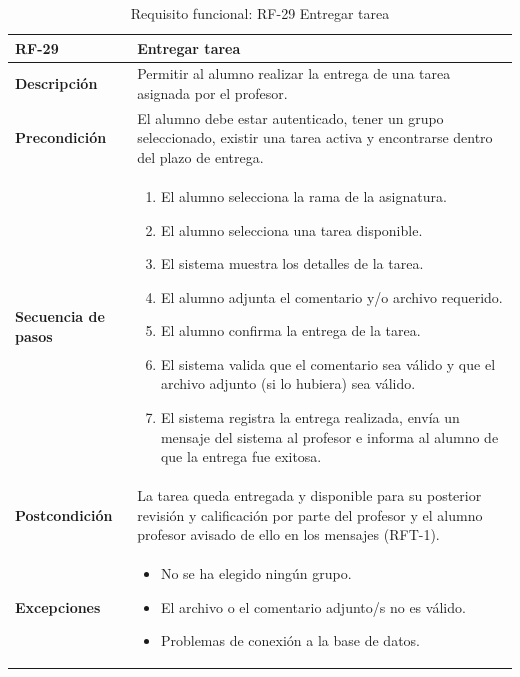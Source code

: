 \begin{table}[H]
\centering
\begin{tabularx}{\textwidth}{
  |>{\centering\arraybackslash}l
  |>{\centering\arraybackslash}X|}
\hline
\textbf{RF-29} & \textbf{Entregar tarea} \\ \hline

\textbf{Descripción} & Permitir al alumno realizar la entrega de una tarea asignada por el profesor. \\ \hline

\textbf{Precondición} & El alumno debe estar autenticado, tener un grupo seleccionado, existir una tarea activa y encontrarse dentro del plazo de entrega. \\ \hline

\textbf{Secuencia de pasos} &
\begin{enumerate}
  \item El alumno selecciona la rama de la asignatura.
  \item El alumno selecciona una tarea disponible.
  \item El sistema muestra los detalles de la tarea.
  \item El alumno adjunta el comentario y/o archivo requerido.
  \item El alumno confirma la entrega de la tarea.
  \item El sistema valida que el comentario sea válido y que el archivo adjunto (si lo hubiera) sea válido.
  \item El sistema registra la entrega realizada, envía un mensaje del sistema al profesor e informa al alumno de que la entrega fue exitosa.
\end{enumerate} \\ \hline

\textbf{Postcondición} & La tarea queda entregada y disponible para su posterior revisión y calificación por parte del profesor y el alumno profesor avisado de ello en los mensajes (RFT-1). \\ \hline

\textbf{Excepciones} &
\begin{itemize}
  \item No se ha elegido ningún grupo.
  \item El archivo o el comentario adjunto/s no es válido.
  \item Problemas de conexión a la base de datos.
\end{itemize} \\ \hline
\end{tabularx}
\caption{Requisito funcional: RF-29 Entregar tarea}
\label{tab:RF-29}
\end{table}
